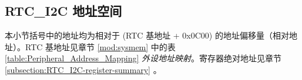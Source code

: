 \documentclass[main\_\_CN.tex]{subfiles}
\begin{document}


\subsection{RTC\_I2C 地址空间}
本小节括号中的地址均为相对于 (RTC 基地址 + 0x0C00) 的地址偏移量（相对地址）。RTC 基地址见章节 \ref{mod:sysmem} \textit{} 中的表 \ref{table:Peripheral_Address_Mapping} \textit{外设地址映射}。寄存器绝对地址见章节 \ref{subsection:RTC_I2C-register-summary} \textit{}。

\end{document}
